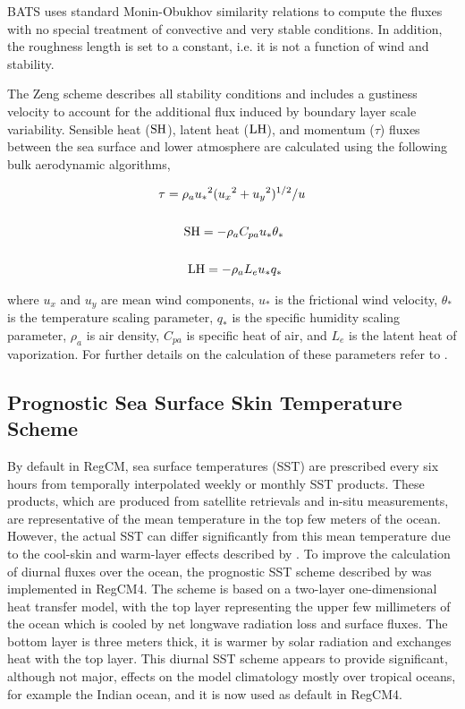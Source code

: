 {\ac{BATS} uses standard Monin-Obukhov similarity relations to compute the
fluxes with no
special treatment of convective and very stable conditions.  In addition, the
roughness length is set to a constant, i.e. it is not a function of wind and
stability.  

The Zeng scheme describes all stability conditions and
includes a gustiness velocity to account for the additional flux induced by
boundary layer scale variability. Sensible heat (${\rm SH}$), latent heat (${\rm
LH}$), and momentum ($\tau$) fluxes between the sea surface and lower atmosphere
are calculated using the following bulk aerodynamic algorithms,
    
\begin{eqnarray}
\tau = \rho_a {u_{\ast}}^2 ({u_{x}}^2 + {u_{y}}^2)^{1/2} / u \\ \nonumber \\
{\rm SH} = -\rho_a C_{pa} u_{\ast} \theta_{\ast} \hspace{.6cm} \\ \nonumber \\
{\rm LH} =  -\rho_a L_{e} u_{\ast} q_{\ast}  \hspace{.65cm}
\end{eqnarray}

where $u_x$ and $u_y$ are mean wind components, $u_{\ast}$ is the
frictional wind velocity, $\theta_{\ast}$ is the temperature scaling parameter,
$q_{\ast}$ is the specific humidity scaling parameter,  $\rho_a$ is air density,
$C_{pa}$ is specific heat of air, and $L_{e}$ is the latent heat of
vaporization.  For further details on the calculation of these parameters refer
to \cite{Zeng_98}.
 
\subsection{Prognostic Sea Surface Skin Temperature Scheme}

By default in \ac{RegCM}, sea surface temperatures (SST) are prescribed every
six hours from temporally interpolated weekly or monthly SST products.
These products, which are produced from satellite retrievals and in-situ
measurements, are representative of the mean temperature in the top
few meters of the ocean. However, the actual SST can differ significantly
from this mean temperature due to the cool-skin and warm-layer effects
described by \cite{Fairall_96}. To improve the calculation of diurnal fluxes
over the ocean, the prognostic SST scheme described by \cite{Zeng_05} was
implemented in \ac{RegCM4}. The scheme is based on a two-layer
one-dimensional heat transfer model, with the top layer representing the
upper few millimeters of the ocean which is cooled by net longwave radiation
loss and surface fluxes. The bottom layer is three meters thick, it is warmer by
solar radiation and exchanges heat with the top layer. This diurnal SST
scheme appears to provide significant, although not major, effects on the
model climatology mostly over tropical oceans, for example the Indian ocean,
and it is now used as default in \ac{RegCM4}.

}
